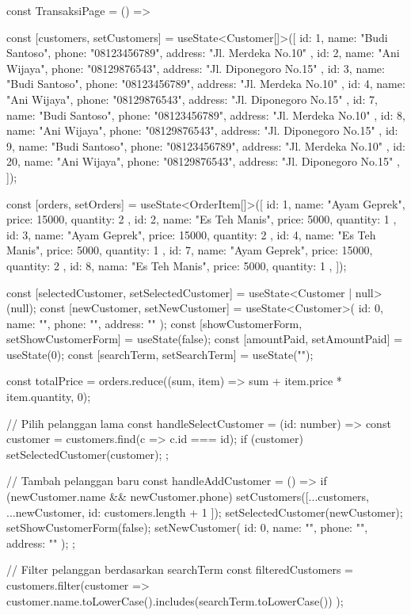 const TransaksiPage = () => {

  const [customers, setCustomers] = useState<Customer[]>([  
    { id: 1, name: "Budi Santoso", phone: "08123456789", address: "Jl. Merdeka No.10" },
    { id: 2, name: "Ani Wijaya", phone: "08129876543", address: "Jl. Diponegoro No.15" },
    { id: 3, name: "Budi Santoso", phone: "08123456789", address: "Jl. Merdeka No.10" },
    { id: 4, name: "Ani Wijaya", phone: "08129876543", address: "Jl. Diponegoro No.15" },
    { id: 7, name: "Budi Santoso", phone: "08123456789", address: "Jl. Merdeka No.10" },
    { id: 8, name: "Ani Wijaya", phone: "08129876543", address: "Jl. Diponegoro No.15" },
    { id: 9, name: "Budi Santoso", phone: "08123456789", address: "Jl. Merdeka No.10" },
    { id: 20, name: "Ani Wijaya", phone: "08129876543", address: "Jl. Diponegoro No.15" },
  ]);

  const [orders, setOrders] = useState<OrderItem[]>([
    { id: 1, name: "Ayam Geprek", price: 15000, quantity: 2 },
    { id: 2, name: "Es Teh Manis", price: 5000, quantity: 1 },
    { id: 3, name: "Ayam Geprek", price: 15000, quantity: 2 },
    { id: 4, name: "Es Teh Manis", price: 5000, quantity: 1 },
    { id: 7, name: "Ayam Geprek", price: 15000, quantity: 2 },
    { id: 8, nama: "Es Teh Manis", price: 5000, quantity: 1 },
  ]);
  
  const [selectedCustomer, setSelectedCustomer] = useState<Customer | null>(null);
  const [newCustomer, setNewCustomer] = useState<Customer>({ id: 0, name: "", phone: "", address: "" });
  const [showCustomerForm, setShowCustomerForm] = useState(false);
  const [amountPaid, setAmountPaid] = useState(0);
  const [searchTerm, setSearchTerm] = useState("");
  
  const totalPrice = orders.reduce((sum, item) => sum + item.price * item.quantity, 0);
  
  // Pilih pelanggan lama
  const handleSelectCustomer = (id: number) => {
    const customer = customers.find(c => c.id === id);
    if (customer) setSelectedCustomer(customer);
  };

  // Tambah pelanggan baru
  const handleAddCustomer = () => {
    if (newCustomer.name && newCustomer.phone) {
      setCustomers([...customers, { ...newCustomer, id: customers.length + 1 }]);
      setSelectedCustomer(newCustomer);
      setShowCustomerForm(false);
      setNewCustomer({ id: 0, name: "", phone: "", address: "" });
    }
  };

  // Filter pelanggan berdasarkan searchTerm
  const filteredCustomers = customers.filter(customer =>
    customer.name.toLowerCase().includes(searchTerm.toLowerCase())
  );



}

